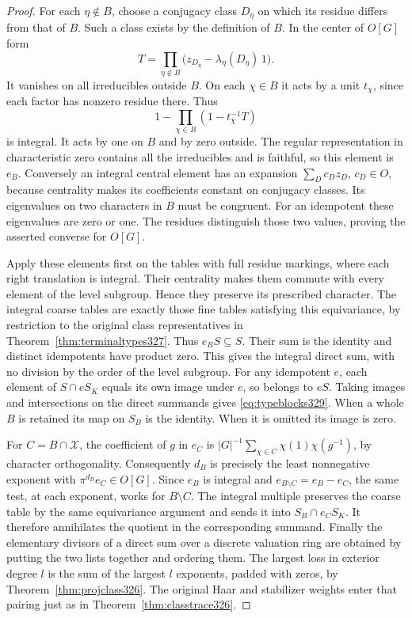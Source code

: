 \documentclass[a4paper,11pt]{article}
\theoremstyle{definition}
\theoremstyle{remark}
\numberwithin{equation}{section}
\begin{document}
\begin{proof}
For each \(\eta\notin B\), choose a conjugacy class \(D_\eta\)
on which its residue differs from that of \(B\). Such a class
exists by the definition of \(B\). In the center of \(O[G]\) form
\[
 T=\prod_{\eta\notin B}
       \bigl(z_{D_\eta}-\lambda_\eta(D_\eta)\,1\bigr).
\]
It vanishes on all irreducibles outside \(B\). On each
\(\chi\in B\) it acts by a unit \(t_\chi\), since each factor
has nonzero residue there. Thus
\[
 1-\prod_{\chi\in B}(1-t_\chi^{-1}T)
\]
is integral. It acts by one on \(B\) and by zero outside.
The regular representation in characteristic zero contains all
the irreducibles and is faithful, so this element is \(e_B\).
Conversely an integral central element has an expansion
\(\sum_D c_Dz_D\), \(c_D\in O\), because centrality makes its
coefficients constant on conjugacy classes. Its eigenvalues on
two characters in \(B\) must be congruent. For an idempotent these
eigenvalues are zero or one. The residues distinguish those two
values, proving the asserted converse for \(O[G]\).

Apply these elements first on the tables with full residue
markings, where each right translation is integral. Their
centrality makes them commute with every element of the level
subgroup. Hence they preserve its prescribed character. The integral
coarse tables are exactly those fine tables satisfying this
equivariance, by restriction to the original class representatives
in Theorem~\ref{thm:terminaltypes327}. Thus \(e_BS\subseteq S\).
Their sum is the identity and distinct idempotents have product
zero. This gives the integral direct sum, with no division by the
order of the level subgroup. For any idempotent \(e\), each element
of \(S\cap eS_K\) equals its own image under \(e\), so belongs to
\(eS\). Taking images and intersections on the direct summands
gives \eqref{eq:typeblocks329}. When a whole \(B\) is retained its
map on \(S_B\) is the identity. When it is omitted its image is zero.

For \(C=B\cap\mathcal X\), the coefficient of \(g\) in \(e_C\)
is \(|G|^{-1}\sum_{\chi\in C}\chi(1)\chi(g^{-1})\), by character
orthogonality. Consequently \(d_B\) is precisely the least
nonnegative exponent with \(\pi^{d_B}e_C\in O[G]\).
Since \(e_B\) is integral and \(e_{B\setminus C}=e_B-e_C\),
the same test, at each exponent, works for \(B\setminus C\).
The integral multiple preserves the coarse table by the same
equivariance argument and sends it into \(S_B\cap e_C S_K\).
It therefore annihilates the quotient in the corresponding
summand. Finally the elementary divisors of a direct sum over
a discrete valuation ring are obtained by putting the two lists
together and ordering them. The largest loss in exterior degree
\(l\) is the sum of the largest \(l\) exponents, padded with zeros,
by Theorem~\ref{thm:projclass326}. The original Haar and stabilizer
weights enter that pairing just as in Theorem~\ref{thm:classtrace326}.
\end{proof}
\end{document}
